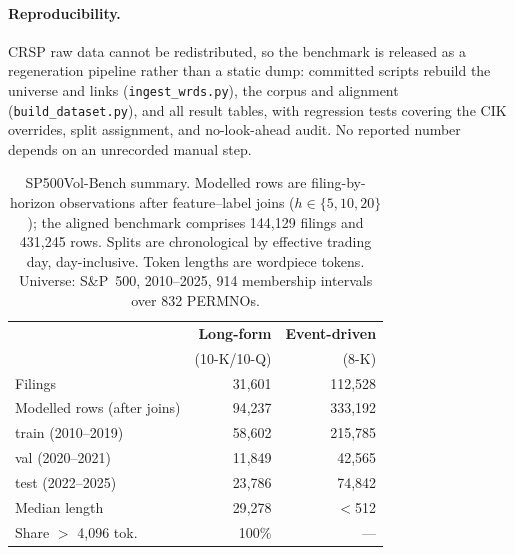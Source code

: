 \paragraph{Reproducibility.}
CRSP raw data cannot be redistributed, so the benchmark is released as a regeneration pipeline rather than a static dump: committed scripts rebuild the universe and links (\texttt{ingest\_wrds.py}), the corpus and alignment (\texttt{build\_dataset.py}), and all result tables, with regression tests covering the CIK overrides, split assignment, and no-look-ahead audit. No reported number depends on an unrecorded manual step.

\begin{table}[t]
\centering
\small
\caption{SP500Vol-Bench summary. Modelled rows are filing-by-horizon observations after feature--label joins ($h\in\{5,10,20\}$); the aligned benchmark comprises 144{,}129 filings and 431{,}245 rows. Splits are chronological by effective trading day, day-inclusive. Token lengths are wordpiece tokens. Universe: S\&P~500, 2010--2025, 914 membership intervals over 832 PERMNOs.}
\label{tab:dataset}
\begin{tabular}{lrr}
\toprule
 & \textbf{Long-form} & \textbf{Event-driven} \\
 & (10-K/10-Q) & (8-K) \\
\midrule
Filings & 31{,}601 & 112{,}528 \\
Modelled rows (after joins) & 94{,}237 & 333{,}192 \\
\quad train (2010--2019) & 58{,}602 & 215{,}785 \\
\quad val (2020--2021) & 11{,}849 & 42{,}565 \\
\quad test (2022--2025) & 23{,}786 & 74{,}842 \\
\midrule
Median length & 29{,}278 & $<$512 \\
Share $>$ 4{,}096 tok. & 100\% & --- \\
\bottomrule
\end{tabular}
\end{table}
